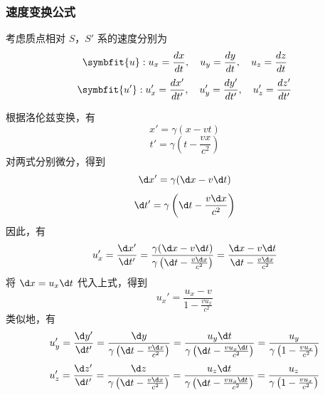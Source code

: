 \subsubsection{速度变换公式}

考虑质点相对 $S$，$S'$ 系的速度分别为
\begin{equation}
    \symbfit{u} : u_x = \frac{d x}{d t} , \quad u_y = \frac{d y}{d t} , \quad u_z = \frac{d z}{d t}
\end{equation}
\begin{equation}
    \symbfit{u'} : u_x' = \frac{d x'}{d t'} , \quad u_y' = \frac{d y'}{d t'} , \quad u_z' = \frac{d z'}{d t'}
\end{equation}

根据洛伦兹变换，有
\begin{equation}
    x' = \gamma (x - v t)
\end{equation}
\begin{equation}
    t' = \gamma \left(t - \frac{v x}{c^2}\right)
\end{equation}
对两式分别微分，得到
\begin{equation}
    \d x' = \gamma (\d x - v \d t)
\end{equation}
\begin{equation}
    \d t' = \gamma \left(\d t - \frac{v \d x}{c^2}\right)
\end{equation}
因此，有
\begin{equation}
    u_x' = \frac{ \d x'}{\d t'} = \frac{\gamma (\d x - v \d t)}{\gamma \left(\d t - \frac{v \d x}{c^2}\right)} = \frac{\d x - v \d t}{\d t - \frac{v \d x}{c^2}}
\end{equation}
将 $\d x = u_x \d t$ 代入上式，得到
\begin{equation}
    u_x' = \frac{u_x - v}{1 - \frac{v u_x}{c^2}}
\end{equation}
类似地，有
\begin{equation}
    u_y' = \frac{\d y'}{\d t'} = \frac{\d y}{\gamma \left(\d t - \frac{v \d x}{c^2}\right)} = \frac{u_y \d t}{\gamma \left(\d t - \frac{v u_x \d t}{c^2}\right)} = \frac{u_y}{\gamma \left(1 - \frac{v u_x}{c^2}\right)}
\end{equation}
\begin{equation}
    u_z' = \frac{\d z'}{\d t'} = \frac{\d z}{\gamma \left(\d t - \frac{v \d x}{c^2}\right)} = \frac{u_z \d t}{\gamma \left(\d t - \frac{v u_x \d t}{c^2}\right)} = \frac{u_z}{\gamma \left(1 - \frac{v u_x}{c^2}\right)}
\end{equation}

